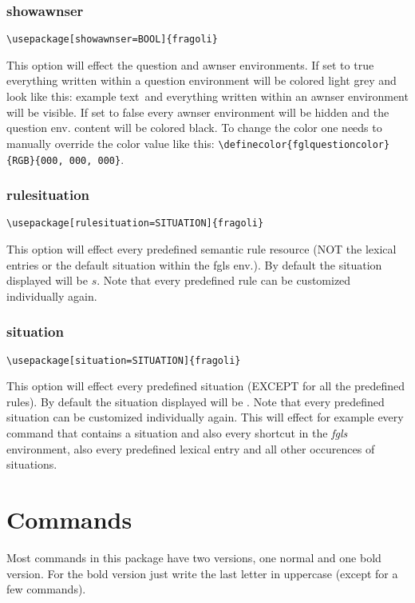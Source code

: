 \documentclass[10pt, a4paper]{article}
\begin{document}
	\subsubsection{showawnser}
	\begin{lstlisting}[style=A]
			\usepackage[showawnser=BOOL]{fragoli}
	\end{lstlisting}
	This option will effect the question and awnser environments. If set to true everything written within a question environment will be colored light grey and look like this: \color{fglquestioncolor}example text\color{black}\ and everything written within an awnser environment will be visible. If set to false every awnser environment will be hidden and the question env. content will be colored black. To change the color one needs to manually override the color value like this: \verb=\definecolor{fglquestioncolor}{RGB}{000, 000, 000}=.
	\subsubsection{rulesituation}
	\begin{lstlisting}[style=A]
			\usepackage[rulesituation=SITUATION]{fragoli}
	\end{lstlisting}
	This option will effect every predefined semantic rule resource (NOT the lexical entries or the default situation within the fgls env.). By default the situation displayed will be $s$. Note that every predefined rule can be customized individually again.
	\subsubsection{situation}
	\begin{lstlisting}[style=A]
			\usepackage[situation=SITUATION]{fragoli}
	\end{lstlisting}
	This option will effect every predefined situation (EXCEPT for all the predefined rules). By default the situation displayed will be \sstar. Note that every predefined situation can be customized individually again. This will effect for example every command that contains a situation and also every shortcut in the \textit{fgls} environment, also every predefined lexical entry and all other occurences of situations.
	\section{Commands}
	Most commands in this package have two versions, one normal and one bold version. For the bold version just write the last letter in uppercase (except for a few commands).
\end{document}
